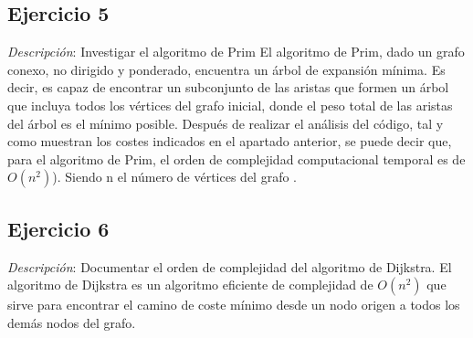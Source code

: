         \subsection{Ejercicio 5}
            \textit{Descripción}: Investigar el algoritmo de Prim
            \newline
            El algoritmo de Prim, dado un grafo conexo, no dirigido y ponderado, encuentra un árbol de expansión mínima. Es decir, es capaz de encontrar un subconjunto de las aristas que formen un árbol que incluya todos los vértices del grafo inicial, donde el peso total de las aristas del árbol es el mínimo posible.
            Después de realizar el análisis del código, tal y como muestran los costes indicados en el apartado anterior, se puede decir que, para el algoritmo de Prim, el orden de complejidad computacional temporal es de \(O(n^{2})\)). Siendo n el número de vértices del grafo \cite{Prim}.
                
        \subsection{Ejercicio 6}
            \textit{Descripción}: Documentar el orden de complejidad del algoritmo de Dijkstra.
            \newline
            El algoritmo de Dijkstra es un algoritmo eficiente de complejidad de \(O(n^{2})\) que sirve para encontrar el camino de coste mínimo desde un nodo origen a todos los demás nodos del grafo.
            
